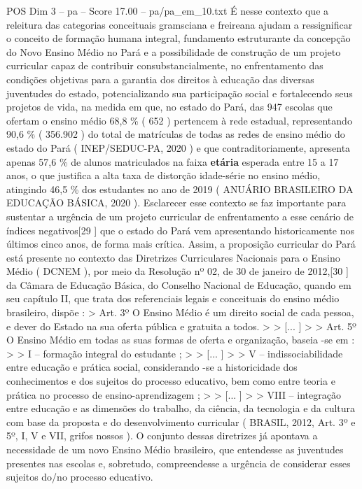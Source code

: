 \begin{textsample}{POS Dim 3 – pa – Score 17.00 – pa/pa\_em\_10.txt}
É nesse contexto que a releitura das categorias conceituais gramsciana e freireana ajudam a ressignificar o conceito de formação humana integral, fundamento estruturante da concepção do Novo Ensino Médio no Pará e a possibilidade de construção de um projeto curricular capaz de contribuir consubstancialmente, no enfrentamento das condições objetivas para a garantia dos direitos à educação das diversas juventudes do estado, potencializando sua participação social e fortalecendo seus projetos de vida, na medida em que, no estado do Pará, das 947 escolas que ofertam o ensino médio 68,8 \% ( 652 ) pertencem à rede estadual, representando 90,6 \% ( 356.902 ) do total de matrículas de todas as redes de ensino médio do estado do Pará ( INEP/SEDUC-PA, 2020 ) e que contraditoriamente, apresenta apenas 57,6 \% de alunos matriculados na faixa \textbf{etária} esperada entre 15 a 17 anos, o que justifica a alta taxa de distorção idade-série no ensino médio, atingindo 46,5 \% dos estudantes no ano de 2019 ( ANUÁRIO BRASILEIRO DA EDUCAÇÃO BÁSICA, 2020 ).
Esclarecer esse contexto se faz importante para sustentar a urgência de um projeto curricular de enfrentamento a esse cenário de índices negativos[29 ] que o estado do Pará vem apresentando historicamente nos últimos cinco anos, de forma mais crítica.
Assim, a proposição curricular do Pará está presente no contexto das Diretrizes Curriculares Nacionais para o Ensino Médio ( DCNEM ), por meio da Resolução nº 02, de 30 de janeiro de 2012,[30 ] da Câmara de Educação Básica, do Conselho Nacional de Educação, quando em seu capítulo II, que trata dos referenciais legais e conceituais do ensino médio brasileiro, dispõe : > Art. 3º O Ensino Médio é um direito social de cada pessoa, e dever do Estado na sua oferta pública e gratuita a todos. > > [... ] > > Art. 5º O Ensino Médio em todas as suas formas de oferta e organização, baseia -se em : > > I – formação integral do estudante ; > > [... ] > > V – indissociabilidade entre educação e prática social, considerando -se a historicidade dos conhecimentos e dos sujeitos do processo educativo, bem como entre teoria e prática no processo de ensino-aprendizagem ; > > [... ] > > VIII – integração entre educação e as dimensões do trabalho, da ciência, da tecnologia e da cultura com base da proposta e do desenvolvimento curricular ( BRASIL, 2012, Art. 3º e 5º, I, V e VII, grifos nossos ).
O conjunto dessas diretrizes já apontava a necessidade de um novo Ensino Médio brasileiro, que entendesse as juventudes presentes nas escolas e, sobretudo, compreendesse a urgência de considerar esses sujeitos do/no processo educativo.

\end{textsample}
